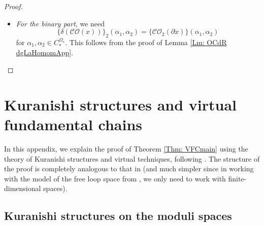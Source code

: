 \documentclass[10pt]{amsart}
\numberwithin{equation}{section}
\theoremstyle{plain}
\theoremstyle{definition}
\theoremstyle{remark}
\numberwithin{equation}{section}
\newcommand{\wt}[1]{\widetilde{#1}}
\newcommand{\CO}{\mathcal{CO}}
\newcommand{\CBa}{C_*^{\Omega_\star}}
\begin{document}
{\begin{proof}
\begin{itemize}
\begin{align*}
	&(-1)^{|\alpha||x|}\big( \wt{\star^1} \bullet (\alpha\circ x)-(\wt{\star^1}\bullet \alpha)\circ x \big)(a,k)\\
	=& (-1)^{|\alpha||x|} \left(-\sum(-1)^{(k'+1)(|x|+1+k'')+|\alpha|} (\wt{\star^1}(0,1)\bullet \alpha(a',k')) \circ_1 x(a'',k'')\right)
\end{align*}
and 
\begin{align*}
	&(-1)^{|\alpha||x|}\big( -  (-1)^{|\alpha|+|x|}(\alpha\circ x) \bullet \wt{\star^1} +(-1)^{|\alpha|} (\alpha\bullet \wt{\star^1})\circ x \big)(a,k)\\
	=& (-1)^{|\alpha|(|x|+1)} \sum (-1)^{k'k'' + (k'+1)(|x|+1+k'')} \big(\alpha(a',k')\bullet \wt{\star^1}(0,1)\big)\circ_{k'+1}x(a'',k'').
\end{align*}
The desired equality then follows from  parts (2) and (4) of Lemma \ref{Lm: dRchainStarAnon}.


	\bigskip
	




 \item \emph{For the binary part}, we need 
	\[\big\{\delta(\CO(x))\big\}_2(\alpha_1,\alpha_2)=\big\{\CO_2(\partial x)\big\}(\alpha_1,\alpha_2) \] for $\alpha_1,\alpha_2\in \CBa$. This follows from the proof of Lemma \ref{Lm: OCdR dgLaHomomApp}.
\end{itemize}
\end{proof}

\bigskip

\section{Kuranishi structures and virtual fundamental chains}
\label{Sec: Kuranishi}



In this appendix, we explain the proof of Theorem \ref{Thm: VFCmain} using the theory of Kuranishi structures and virtual techniques, following \cite{FOOO20book,Irie2}.
The structure of the proof is completely analogous to that in \cite{Irie2} (and much simpler since in working with the model of the free loop space from \cite{WangThesis}, we only need to work with finite-dimensional spaces).








\subsection{Kuranishi structures on the moduli spaces}





}
\end{document}
